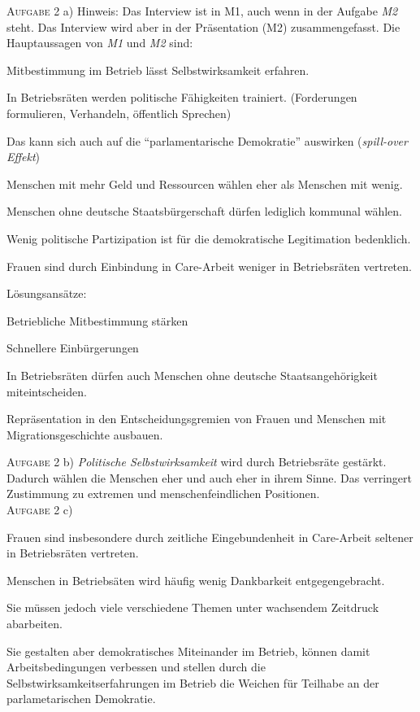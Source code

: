 \textsc{Aufgabe 2} a) \quad
Hinweis: Das Interview ist in M1, auch wenn in der Aufgabe \emph{M2} steht. 
Das Interview wird aber in der Präsentation (M2) zusammengefasst. Die Hauptaussagen von \emph{M1} und \emph{M2} sind: 
\begin{myitemize}
    \item Mitbestimmung im Betrieb lässt Selbstwirksamkeit erfahren.
    \item In Betriebsräten werden politische Fähigkeiten trainiert. (Forderungen formulieren, Verhandeln, öffentlich Sprechen)
    \item Das kann sich auch auf die \enquote{parlamentarische Demokratie} auswirken (\emph{spill-over Effekt})
    \item Menschen mit mehr Geld und Ressourcen wählen eher als Menschen mit wenig.
    \item Menschen ohne deutsche Staatsbürgerschaft dürfen lediglich kommunal wählen. %
    \item Wenig politische Partizipation ist für die demokratische Legitimation bedenklich. 
    \item Frauen sind durch Einbindung in Care-Arbeit weniger in Betriebsräten vertreten. 
    \item Lösungsansätze: 
    \begin{myitemize}
        \item Betriebliche Mitbestimmung stärken
        \item Schnellere Einbürgerungen 
        \item In Betriebsräten dürfen auch Menschen ohne deutsche Staatsangehörigkeit miteintscheiden. 
        \item Repräsentation in den Entscheidungsgremien von Frauen und Menschen mit Migrationsgeschichte ausbauen.
    \end{myitemize} 
\end{myitemize}



\textsc{Aufgabe 2} b) \quad
\emph{Politische Selbstwirksamkeit} wird durch Betriebsräte gestärkt. Dadurch wählen die Menschen eher und auch eher in ihrem Sinne. 
Das verringert Zustimmung zu extremen und menschenfeindlichen Positionen. 
\\

\textsc{Aufgabe 2} c) \quad
\begin{myitemize}
    \item Frauen sind insbesondere durch zeitliche Eingebundenheit in Care-Arbeit seltener in Betriebsräten vertreten.
    \item Menschen in Betriebsäten wird häufig wenig Dankbarkeit entgegengebracht.
    \item Sie müssen jedoch viele verschiedene Themen unter wachsendem Zeitdruck abarbeiten. 
    \item Sie gestalten aber demokratisches Miteinander im Betrieb, können damit Arbeitsbedingungen verbessen und stellen durch die Selbstwirksamkeitserfahrungen im Betrieb die Weichen für Teilhabe an der parlametarischen Demokratie. 
\end{myitemize} 


